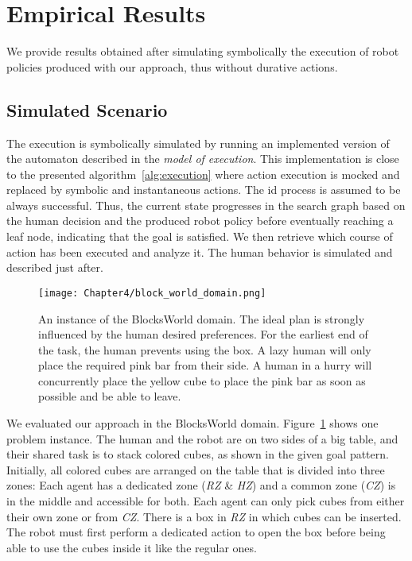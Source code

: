 \section{Empirical Results}

We provide results obtained after simulating symbolically the execution of robot policies produced with our approach, thus without durative actions. 

    \subsection{Simulated Scenario}

The execution is symbolically simulated by running an implemented version of the automaton described in the \textit{model of execution}. This implementation is close to the presented algorithm~\ref{alg:execution} where action execution is mocked and replaced by symbolic and instantaneous actions. 
The \acrshort{id} process is assumed to be always successful.
Thus, the current state progresses in the search graph based on the human decision and the produced robot policy before eventually reaching a leaf node, indicating that the goal is satisfied. 
We then retrieve which course of action has been executed and analyze it.
The human behavior is simulated and described just after. 

\begin{figure}[h]
    \centering
    \texttt{[image: Chapter4/block\_world\_domain.png]}
    \caption{An instance of the BlocksWorld domain. The ideal plan is strongly influenced by the human desired preferences. For the earliest end of the task, the human prevents using the box. A lazy human will only place the required pink bar from their side. A human in a hurry will concurrently place the yellow cube to place the pink bar as soon as possible and be able to leave.}
    \label{fig:block_world_domain}
\end{figure}

We evaluated our approach in the BlocksWorld domain. Figure~\ref{fig:block_world_domain} shows one problem instance. 
The human and the robot are on two sides of a big table, and their shared task is to stack colored cubes, as shown in the given goal pattern. 
Initially, all colored cubes are arranged on the table that is divided into three zones: Each agent has a dedicated zone (\textit{RZ} \& \textit{HZ}) and a common zone (\textit{CZ}) is in the middle and accessible for both. 
Each agent can only pick cubes from either their own zone or from \textit{CZ}. 
There is a box in \textit{RZ} in which cubes can be inserted. The robot must first perform a dedicated action to open the box before being able to use the cubes inside it like the regular ones.


